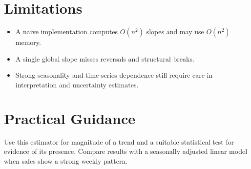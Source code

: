 \documentclass[a4paper]{article}
\begin{document}
\section{Limitations}
\begin{itemize}
 \item A naive implementation computes $O(n^2)$ slopes and may use $O(n^2)$ memory.
 \item A single global slope misses reversals and structural breaks.
 \item Strong seasonality and time-series dependence still require care in interpretation and uncertainty estimates.
\end{itemize}

\section{Practical Guidance}
Use this estimator for magnitude of a trend and a suitable statistical test for evidence of its presence. Compare results with a seasonally adjusted linear model when sales show a strong weekly pattern.



\end{document}
